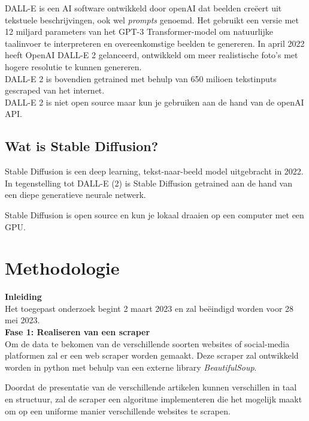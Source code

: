 \noindent
DALL-E is een AI software ontwikkeld door openAI dat beelden creëert uit tekstuele beschrijvingen, ook wel \emph{prompts} genoemd. Het gebruikt een versie met 12 miljard parameters van het GPT-3 Transformer-model om natuurlijke taalinvoer te interpreteren en overeenkomstige beelden te genereren. In april 2022 heeft OpenAI DALL-E 2 gelanceerd, ontwikkeld om meer realistische foto's met hogere resolutie te kunnen genereren. \autocite{DallEWikipediaNL}  \autocite{DallEWikipediaEN}\\

\noindent
DALL-E 2 is bovendien getrained met behulp van 650 milioen tekstinputs gescraped van het internet. \autocite{Borji2022} \\

\noindent
DALL-E 2 is niet open source maar kun je gebruiken aan de hand van de openAI API.  \\
\subsection{Wat is Stable Diffusion?}
\noindent
Stable Diffusion is een deep learning, tekst-naar-beeld model uitgebracht in 2022. In tegenstelling tot DALL-E (2) is Stable Diffusion getrained aan de hand van een diepe generatieve neurale netwerk.
\autocite{StableDifWikipediaEN}

Stable Diffusion is open source en kun je lokaal draaien op een computer met een GPU.



\section{Methodologie}%
\label{sec:methodologie}
\noindent
\textbf{Inleiding} \\
Het toegepast onderzoek begint 2 maart 2023 en zal beëindigd worden voor 28 mei 2023. \\

\noindent
\textbf{Fase 1: Realiseren van een scraper} \\
Om de data te bekomen van de verschillende soorten websites of social-media platformen zal er een web scraper worden gemaakt. Deze scraper zal ontwikkeld worden in python met behulp van een externe library \emph{BeautifulSoup}.

\noindent
Doordat de presentatie van de verschillende artikelen kunnen verschillen in taal en structuur, zal de scraper een algoritme implementeren die het mogelijk maakt om op een uniforme manier verschillende websites te scrapen. \\

